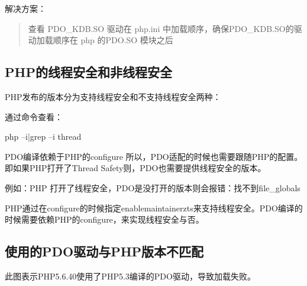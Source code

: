 \documentclass[letterpaper,10pt,english]{sphinxmanual}
\begin{document}
解决方案：
\begin{quote}

查看 PDO\_KDB.SO 驱动在 php.ini 中加载顺序，确保PDO\_KDB.SO的驱动加载顺序在 php 的PDO.SO 模块之后
\end{quote}


\subsection{PHP的线程安全和非线程安全}
\label{\detokenize{interface/pdo:php}}
PHP发布的版本分为支持线程安全和不支持线程安全两种：

通过命令查看：

\begin{sphinxVerbatim}[commandchars=\\\{\}]
php –i|grep –i thread
\end{sphinxVerbatim}

\begin{figure}[htbp]
\centering

\noindent{}
\end{figure}

PDO编译依赖于PHP的configure  所以，PDO适配的时候也需要跟随PHP的配置。即如果PHP打开了Thread  Safety则，PDO也需要提供线程安全的版本。

\begin{figure}[htbp]
\centering

\noindent{}
\end{figure}

例如：PHP 打开了线程安全，PDO是没打开的版本则会报错：找不到file\_globals

PHP通过在configure的时候指定\sphinxhyphen{}\sphinxhyphen{}enable\sphinxhyphen{}maintainer\sphinxhyphen{}zts来支持线程安全。PDO编译的时候需要依赖PHP的configure，来实现线程安全与否。


\subsection{使用的PDO驱动与PHP版本不匹配}
\label{\detokenize{interface/pdo:pdophp}}
\begin{figure}[htbp]
\centering

\noindent{}
\end{figure}

此图表示PHP5.6.40使用了PHP5.3编译的PDO驱动，导致加载失败。

\begin{sphinxVerbatim}[commandchars=\\\{\}]
    
    
\end{sphinxVerbatim}
\end{document}

